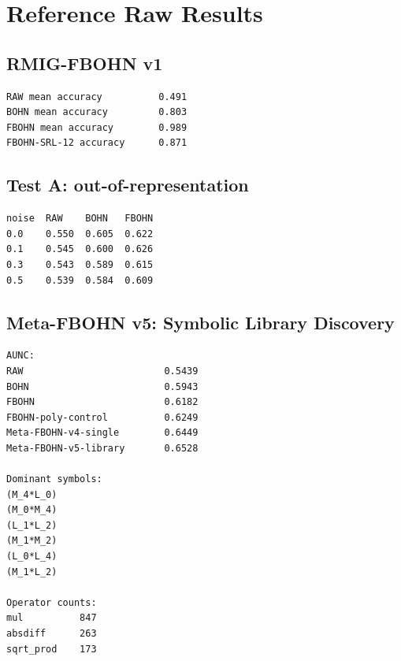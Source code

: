 \documentclass[11pt,a4paper]{report}
\begin{document}
\section*{Reference Raw Results}

\subsection*{RMIG-FBOHN v1}
\begin{lstlisting}[basicstyle=\ttfamily\footnotesize]
RAW mean accuracy          0.491
BOHN mean accuracy         0.803
FBOHN mean accuracy        0.989
FBOHN-SRL-12 accuracy      0.871
\end{lstlisting}

\subsection*{Test A: out-of-representation}
\begin{lstlisting}[basicstyle=\ttfamily\footnotesize]
noise  RAW    BOHN   FBOHN
0.0    0.550  0.605  0.622
0.1    0.545  0.600  0.626
0.3    0.543  0.589  0.615
0.5    0.539  0.584  0.609
\end{lstlisting}

\subsection*{Meta-FBOHN v5: Symbolic Library Discovery}
\begin{lstlisting}[basicstyle=\ttfamily\footnotesize]
AUNC:
RAW                         0.5439
BOHN                        0.5943
FBOHN                       0.6182
FBOHN-poly-control          0.6249
Meta-FBOHN-v4-single        0.6449
Meta-FBOHN-v5-library       0.6528

Dominant symbols:
(M_4*L_0)
(M_0*M_4)
(L_1*L_2)
(M_1*M_2)
(L_0*L_4)
(M_1*L_2)

Operator counts:
mul          847
absdiff      263
sqrt_prod    173
\end{lstlisting}
\end{document}
